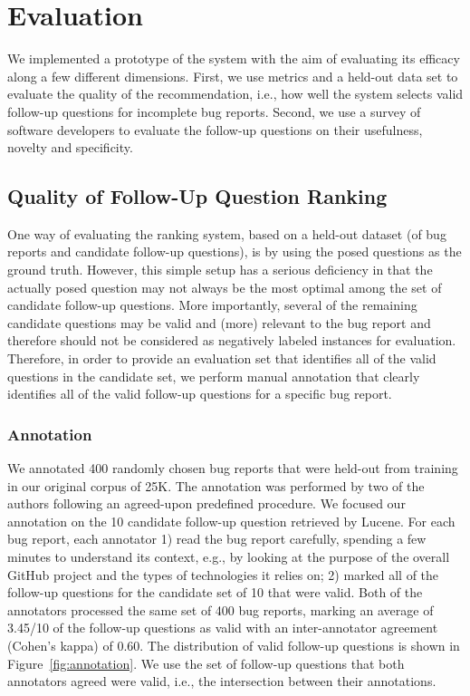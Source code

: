 \section{Evaluation}

We implemented a prototype of the system with the aim of evaluating its efficacy along
a few different dimensions. First, we use metrics and a held-out data set to evaluate the quality
of the recommendation, i.e., how well the system selects valid follow-up questions for incomplete bug reports.
Second, we use a survey of software developers to evaluate the follow-up questions on their usefulness, novelty and specificity.


\subsection{Quality of Follow-Up Question Ranking}

One way of evaluating the ranking system, based on a held-out dataset (of bug reports and candidate follow-up questions), is
by using the posed questions as the ground truth. However, this simple setup has a serious deficiency in that the actually posed question
may not always be the most optimal among the set of candidate follow-up questions. More importantly, several of
the remaining candidate questions may be valid and (more) relevant to the bug report and therefore should
not be considered as negatively labeled instances for evaluation. Therefore, in order to provide an evaluation
set that identifies all of the valid questions in the candidate set, we perform manual annotation that clearly
identifies all of the valid follow-up questions for a specific bug report.

\subsubsection{Annotation}
We annotated 400 randomly chosen bug reports that were held-out from training in our original corpus of 25K. The annotation
was performed by two of the authors following an agreed-upon predefined procedure. We focused our annotation on the 10 candidate follow-up question retrieved by Lucene. For each bug report, each annotator 1)
read the bug report carefully, spending a few minutes to understand its context, e.g., by looking at the purpose of the overall GitHub
project and the types of technologies it relies on; 2) marked all of the follow-up questions for the candidate set of 10
that were valid. Both of the annotators processed the same set of 400 bug reports, marking an average of 3.45/10 of the follow-up questions as valid with an inter-annotator agreement (Cohen's kappa) of 0.60. The distribution of valid follow-up questions is shown in Figure~\ref{fig:annotation}.
We use the set of follow-up questions that both annotators agreed were valid, i.e., the intersection between their annotations.


